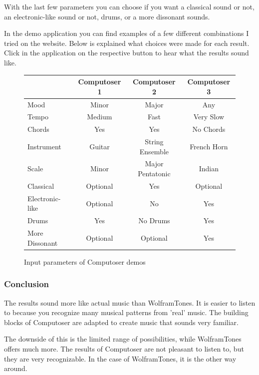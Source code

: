\documentclass[12pt]{article}
\begin{document}
With the last few parameters you can choose if you want a classical sound or not, an electronic-like sound or not, drums, or a more dissonant sounds.
\newline

In the demo application you can find examples of a few different combinations I tried on the website. Below is explained what choices were made for each result. Click in the application on the respective button to hear what the results sound like.
\newline

\begin{figure}
\begin{tabular}[]{| l |  c | c | c |}
\hline
& Computoser 1 & Computoser 2 & Computoser 3 \\ \hline
Mood & Minor & Major & Any \\
Tempo & Medium & Fast & Very Slow \\
Chords & Yes & Yes & No Chords \\
Instrument & Guitar & String Ensemble & French Horn \\
Scale & Minor & Major Pentatonic & Indian \\
Classical & Optional & Yes & Optional \\
Electronic-like & Optional & No & Yes\\
Drums & Yes & No Drums & Yes \\
More Dissonant & Optional & Optional & Yes \\
\hline
\end{tabular}
\caption{Input parameters of Computoser demos}
\label{inputparameters}
\end{figure}

\newpage

\subsubsection{Conclusion}

The results sound more like actual music than WolframTones. It is easier to listen to because you recognize many musical patterns from 'real' music. The building blocks of Computoser are adapted to create music that sounds very familiar.
\newline

The downside of this is the limited range of possibilities, while WolframTones offers much more. The results of Computoser are not pleasant to listen to, but they are very recognizable. In the case of WolframTones, it is the other way around.  
\newpage
\end{document}
